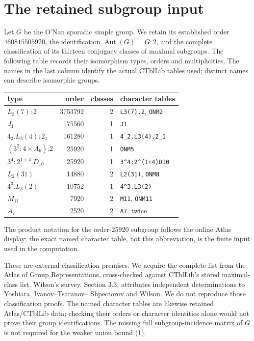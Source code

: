 \documentclass[11pt,a4paper]{article}
\newcommand{\Aut}{\operatorname{Aut}}
\begin{document}
\section{The retained subgroup input}
Let $G$ be the O'Nan sporadic simple group. We retain its established
order $460815505920$, the identification $\Aut(G)=G:2$, and the complete
classification of its thirteen conjugacy classes of maximal subgroups.
The following table records their isomorphism types, orders and
multiplicities. The names in the last column identify the actual
CTblLib tables used; distinct names can describe isomorphic groups.
\begin{center}\small
\begin{tabular}{lrrl}\toprule
type&order&classes&character tables\\\midrule
$L_3(7):2$&3753792&2&\texttt{L3(7).2}, \texttt{ONM2}\\
$J_1$&175560&1&\texttt{J1}\\
$4_2.L_3(4):2_1$&161280&1&\texttt{4\_2.L3(4).2\_1}\\
$(3^2:4\mathbin\times A_6).2$&25920&1&\texttt{ONM5}\\
$3^4:2^{1+4}.D_{10}$&25920&1&\texttt{3\^{}4:2\^{}(1+4)D10}\\
$L_2(31)$&14880&2&\texttt{L2(31)}, \texttt{ONM8}\\
$4^3.L_3(2)$&10752&1&\texttt{4\^{}3.L3(2)}\\
$M_{11}$&7920&2&\texttt{M11}, \texttt{ONM11}\\
$A_7$&2520&2&\texttt{A7}, twice\\\bottomrule
\end{tabular}\end{center}
The product notation for the order-25920 subgroup follows the online
Atlas display; the exact named character table, not this abbreviation,
is the finite input used in the computation.

These are external classification premises. We acquire the complete
list from the Atlas of Group Representations, cross-checked against
CTblLib's stored maximal-class list. Wilson's survey, Section 3.3,
attributes independent determinations to Yoshiara, Ivanov--Tsaranov--
Shpectorov and Wilson. We do not reproduce those classification proofs.
The named character tables are likewise retained Atlas/CTblLib data;
checking their orders or character identities alone would not prove
their group identifications. The missing full subgroup-incidence matrix
of $G$ is not required for the weaker union bound (1).
\end{document}
